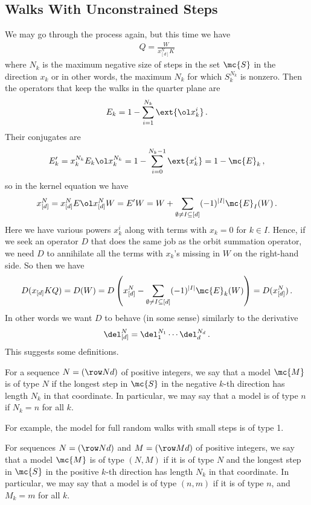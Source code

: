 \subsection{Walks With Unconstrained Steps}
We may go through the process again, but this time we have
\begin{align}
	Q = \frac{W}{x_{[d]}^N K}
\end{align}
where $N_k$ is the maximum negative size of steps in the set $\mc{S}$ in the direction $x_k$ or in other words, the maximum $N_k$ for which $S_k^{N_k}$ is nonzero. Then the operators that keep the walks in the quarter plane are
\begin{align}
	E_k = 1 - \sum_{i=1}^{N_k} \ext{\ol x_k^i}\,.
\end{align}
Their conjugates are
\begin{align}
	E_k' = x_k^{N_k} E_k \ol x_k^{N_k} = 1 - \sum_{i=0}^{N_k-1}\ext{x_k^i} = 1 -\mc{E}_k\,,
\end{align}
so in the kernel equation we have
\begin{align}
	x_{[d]}^N = x_{[d]}^N E \ol x_{[d]}^N W = E' W = W +  \sum_{\emptyset \neq I\subseteq [d]} (-1)^{|I|} \mc{E}_I(W)\,.
\end{align}
Here we have various powers $x_k^i$ along with terms with $x_k = 0$ for $k \in I$. Hence, if we seek an operator $D$ that does the same job as the orbit summation operator, we need $D$ to annihilate all the terms with $x_k$'s missing in $W$ on the right-hand side. So then we have
\begin{align}
	D(x_{[d]}KQ) = D(W) = D\left(x_{[d]}^N-\sum_{\emptyset \neq I\subseteq [d]} (-1)^{|I|} \mc{E}_k(W)\right) = D(x_{[d]}^N)\,.
\end{align}
In other words we want $D$ to behave (in some sense) similarly to the derivative
\begin{align}
\del_{[d]}^N = \del_1^{N_1}\cdots \del_d^{N_d}\,.
\end{align}
This suggests some definitions.
\begin{definition}For a sequence $N = (\row Nd)$ of positive integers, we say that a model $\mc{M}$ is of type $N$ if the longest step in $\mc{S}$ in the negative $k$-th direction has length $N_k$ in that coordinate. In particular, we may say that a model is of type $n$ if $N_k = n$ for all $k$.
\end{definition}
For example, the model for full random walks with small steps is of type 1.
\begin{definition}For sequences $N = (\row Nd)$ and $M = (\row Md)$ of positive integers, we say that a model $\mc{M}$ is of type $(N,M)$ if it is of type $N$ and the longest step in $\mc{S}$ in the positive $k$-th direction has length $N_k$ in that coordinate. In particular, we may say that a model is of type $(n,m)$ if it is of type $n$, and $M_k = m$ for all $k$.
\end{definition}
